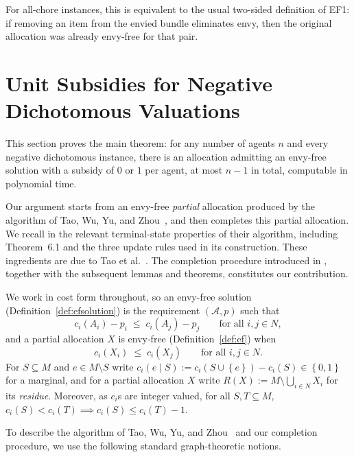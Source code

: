 \documentclass[sigconf,anonymous]{aamas}
\newcommand{\agents}{N}
\newcommand{\items}{M}
\newcommand{\bundle}[1]{A_{#1}}
\newcommand{\subsidy}{p}
\newcommand{\cost}{c}
\newcommand{\set}[1]{\left\{#1\right\}}
\theoremstyle{acmplain}
\theoremstyle{acmdefinition}
\theoremstyle{acmplain}
\begin{document}
For all-chore instances, this is equivalent to the usual two-sided
definition of EF1: if removing an item from the envied bundle
eliminates envy, then the original allocation was already envy-free
for that pair.
\section{Unit Subsidies for Negative Dichotomous Valuations}
\label{sec:main}

This section proves the main theorem: for any number of agents $n$ and every negative dichotomous instance, there is an allocation admitting an envy-free solution with a subsidy of $0$ or $1$ per agent, at most $n-1$ in total, computable in polynomial time. 


Our argument starts from an envy-free \emph{partial} allocation produced by the algorithm of Tao, Wu, Yu, and Zhou~\cite{tao2025existence}, and then completes this partial allocation. We recall in  the relevant terminal-state properties of their algorithm, including Theorem~6.1 and the three update rules used in its construction. These ingredients are due to Tao et al.~\cite{tao2025existence}. The completion procedure introduced in , together with the subsequent lemmas and theorems, constitutes our contribution.


We work in cost form throughout, so an envy-free solution (Definition~\ref{def:efsolution}) is the requirement $(\mathcal{A},p)$ such that
\begin{equation} \label{eq:m-ef}
  \cost_i(\bundle i) - \subsidy_i \;\le\; \cost_i(\bundle j) - \subsidy_j  \qquad \text{for all } i,j \in \agents ,
\end{equation} 
and a partial allocation $X$ is envy-free (Definition~\ref{def:ef}) when
\begin{equation} \label{eq:m-pef}
  \cost_i(X_i) \;\le\; \cost_i(X_j)
  \qquad \text{for all } i,j \in \agents .
\end{equation}
For $S \subseteq \items$ and $e \in \items \setminus S$ write $\cost_i(e \mid S) := \cost_i(S \cup \set e) - \cost_i(S) \in \set{0,1}$ for a marginal, and for a partial allocation $X$ write $R(X) := \items \setminus \bigcup_{i \in \agents} X_i$ for its \emph{residue}.  Moreover, as $\cost_i$s are integer valued, for all $S,T\subseteq M$, \(\cost_i(S) < \cost_i(T) \implies \cost_i(S) \le \cost_i(T) - 1 .
 \)

To describe the algorithm of Tao, Wu, Yu, and Zhou~\cite{tao2025existence} and our completion procedure, we use the following standard graph-theoretic notions.
\end{document}
